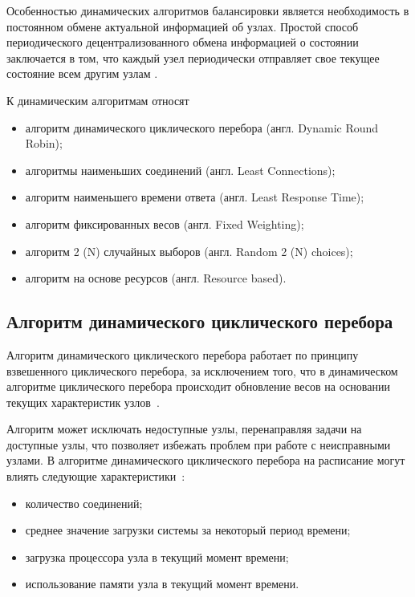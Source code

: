 Особенностью динамических алгоритмов балансировки является необходимость в постоянном обмене актуальной информацией об узлах.
Простой способ периодического децентрализованного обмена информацией о состоянии заключается в том, что каждый узел периодически отправляет свое текущее состояние всем другим узлам \cite{drr}.

К динамическим алгоритмам относят~\cite{drr, dll_warsh, mainsource}
\begin{itemize}
	\item алгоритм динамического циклического перебора (англ. Dynamic Round Robin);
	\item алгоритмы наименьших соединений (англ. Least Connections);
	\item алгоритм наименьшего времени ответа (англ. Least Response Time);
    \item алгоритм фиксированных весов (англ. Fixed Weighting);
	\item алгоритм 2 (N) случайных выборов (англ. Random 2 (N) choices);
	\item алгоритм на основе ресурсов (англ. Resource based).
\end{itemize}


\subsection{Алгоритм динамического циклического перебора}

Алгоритм динамического циклического перебора работает по принципу взвешенного циклического перебора, за исключением того, что 
в динамическом алгоритме циклического перебора происходит обновление весов на основании текущих характеристик узлов~\cite{drr, nginx2}.

Алгоритм может исключать недоступные узлы, перенаправляя задачи на доступные узлы, что позволяет избежать проблем при работе с неисправными узлами. 
В алгоритме динамического циклического перебора на расписание могут влиять следующие характеристики~\cite{dll_warsh, com_analysis, part_algos}: 
\begin{itemize}
	\item количество соединений;
	\item среднее значение загрузки системы за некоторый период времени;
	\item загрузка процессора узла в текущий момент времени;
	\item использование памяти узла в текущий момент времени.
\end{itemize}

